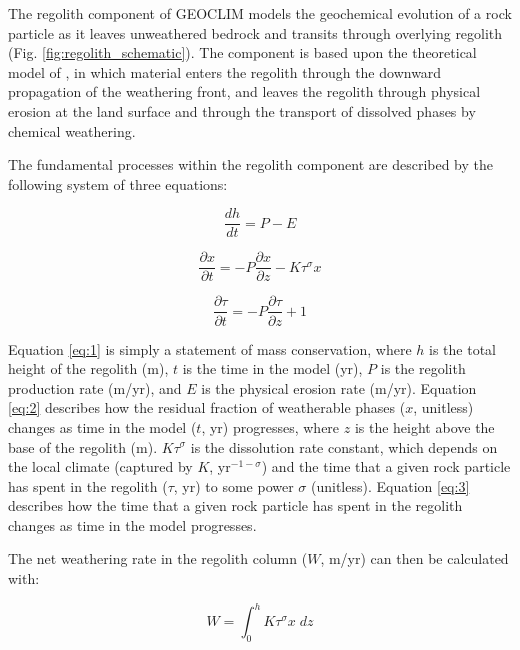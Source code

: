 \documentclass[11pt,letterpaper]{article}
\begin{document}
The regolith component of GEOCLIM models the geochemical evolution of a rock particle as it leaves unweathered bedrock and transits through overlying regolith (Fig. \ref{fig:regolith_schematic}). The component is based upon the theoretical model of \citet{Gabet2009a}, in which material enters the regolith through the downward propagation of the weathering front, and leaves the regolith through physical erosion at the land surface and through the transport of dissolved phases by chemical weathering.

The fundamental processes within the regolith component are described by the following system of three equations:

\begin{equation}
    \frac{dh}{dt} = P - E
    \label{eq:1}
\end{equation}

\begin{equation}
    \frac{\partial x}{\partial t} = -P \frac{\partial x}{\partial z} - K \tau^{\sigma}x
    \label{eq:2}
\end{equation}

\begin{equation}
    \frac{\partial \tau}{\partial t} = -P \frac{\partial \tau}{\partial z} + 1
    \label{eq:3}
\end{equation}

\noindent
Equation \ref{eq:1} is simply a statement of mass conservation, where $h$ is the total height of the regolith (m), $t$ is the time in the model (yr), $P$ is the regolith production rate (m/yr), and $E$ is the physical erosion rate (m/yr). Equation \ref{eq:2} describes how the residual fraction of weatherable phases ($x$, unitless) changes as time in the model ($t$, yr) progresses, where $z$ is the height above the base of the regolith (m). $K \tau^{\sigma}$ is the dissolution rate constant, which depends on the local climate (captured by $K$, yr$^{-1-\sigma}$) and the time that a given rock particle has spent in the regolith ($\tau$, yr) to some power $\sigma$ (unitless). Equation \ref{eq:3} describes how the time that a given rock particle has spent in the regolith changes as time in the model progresses.

The net weathering rate in the regolith column ($W$, m/yr) can then be calculated with:

\begin{equation}
    W = \int_{0}^{h} K \tau^{\sigma} x\;dz
    \label{eq:4}
\end{equation}
\end{document}
